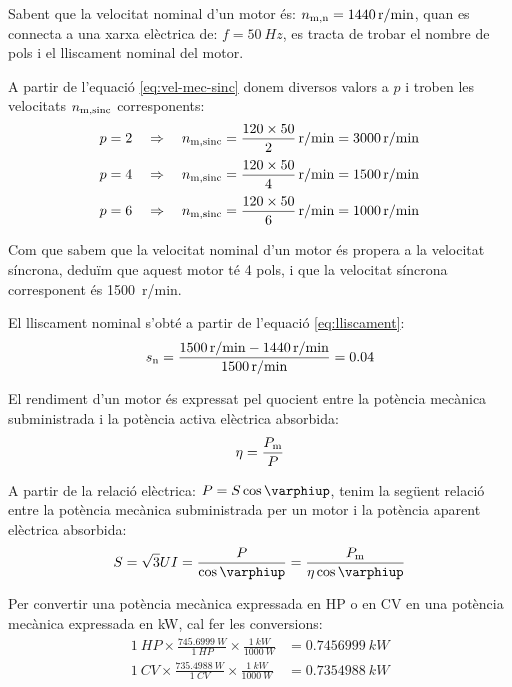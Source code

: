 	
\begin{exemple}[\MotorNombrePols{}]
	\addcontentsxms{\MotorNombrePols}
    Sabent que la velocitat nominal d'un motor és: $n_\mathrm{m,n} = \qty{1440}{r/min}$, quan es connecta a una xarxa elèctrica de: $f = \qty{50}{Hz}$,  es tracta de trobar el nombre de pols i el lliscament nominal del motor.

    A partir de l'equació \eqref{eq:vel-mec-sinc} donem diversos valors a $p$ i troben les velocitats $n_\mathrm{m,sinc}$ corresponents:
    \begin{align*}
      p = 2 \quad  &\Rightarrow \quad n\ped{m,sinc} = \frac{120 \times 50}{2} \, \unit{r/min} = \qty{3000}{r/min}\\[0.5ex]
      p = 4 \quad  &\Rightarrow \quad n\ped{m,sinc} = \frac{120 \times 50}{4} \, \unit{r/min} = \qty{1500}{r/min}\\[0.5ex]
      p = 6 \quad  &\Rightarrow \quad n\ped{m,sinc} = \frac{120 \times 50}{6} \, \unit{r/min} = \qty{1000}{r/min}
    \end{align*}

    Com que sabem que la velocitat nominal d'un motor és propera a la velocitat síncrona, deduïm que aquest motor té 4 pols, i que la velocitat síncrona corresponent és \qty{1500}{r/min}.

    El lliscament nominal s'obté a partir de l'equació \eqref{eq:lliscament}:
    \[
      s_\mathrm{n} = \frac{\qty{1500}{r/min} - \qty{1440}{r/min}}{\qty{1500}{r/min}} = \num{0,04}
    \]
\end{exemple}

El rendiment d'un motor és expressat pel quocient entre la potència mecànica subministrada i la potència activa elèctrica absorbida:
\begin{equation}\index{rendiment}\index{potència!mecànica}
    \eta = \frac{P\ped{m}}{P}
\end{equation}

A partir de la relació elèctrica: $P = S \cos\varphiup$, tenim la següent relació entre la potència mecànica subministrada per un motor i la potència aparent elèctrica absorbida:
\begin{equation}
    S = \sqrt{3} U I = \frac{P}{\cos\varphiup} = \frac{P\ped{m}}{\eta \cos\varphiup}\label{eq:mot-S-Pm}
\end{equation}

Per  convertir una potència mecànica expressada en HP o en CV en una  potència mecànica expressada en kW, cal  fer les conversions:
\begin{subequations}
\begin{align}
  \qty{1}{HP} \times \frac{\qty{745,6999}{W}}{\qty{1}{HP}} \times \frac{\qty{1}{kW}}{\qty{1000}{W}} &= \qty{0,7456999}{kW} \\[1ex]
  \qty{1}{CV} \times \frac{\qty{735,4988}{W}}{\qty{1}{CV}} \times \frac{\qty{1}{kW}}{\qty{1000}{W}} &= \qty{0,7354988}{kW}
\end{align}
\end{subequations}

